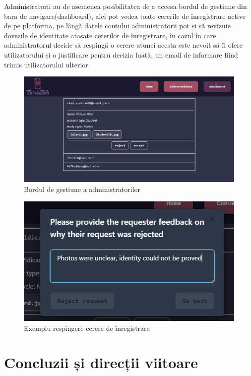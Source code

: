 \documentclass[12pt,a4paper,hidelinks]{report}
\theoremstyle{definition}
\theoremstyle{remark}
\begin{document}
Administratorii au de asemenea posibilitatea de a accesa bordul de gestiune din bara de navigare(dashboard), 
aici pot vedea toate cererile de înregistrare active de pe platforma, pe lângă datele contului 
administratorii pot și să revizuie dovezile de identitate atașate cererilor de înregistrare,
în cazul în care administratorul decide să respingă o cerere atunci acesta este nevoit să îi ofere utilizatorului și o justificare 
pentru decizia luată, un email de informare fiind trimis utilizatorului ulterior.
\begin{figure}[H]
    \centering
    \includegraphics[scale=0.5]{images/Dashboard.PNG}
    \caption{Bordul de gestiune a administratorilor}
\end{figure}
\begin{figure}[H]
    \centering
    \includegraphics[scale=0.7]{images/RejectRequest.PNG}
    \caption{Exemplu respingere cerere de înregistrare}
\end{figure}
\chapter{Concluzii și direcții viitoare}
\end{document}
